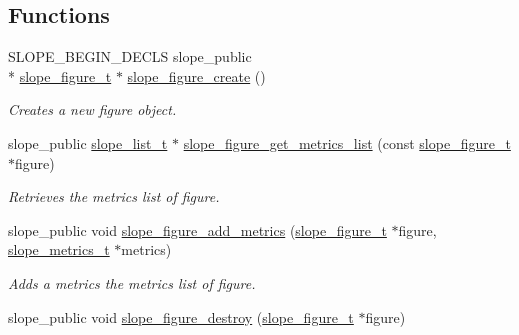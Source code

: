 \subsection*{Functions}
\begin{DoxyCompactItemize}
\item 
S\+L\+O\+P\+E\+\_\+\+B\+E\+G\+I\+N\+\_\+\+D\+E\+C\+L\+S slope\+\_\+public \\*
\hyperlink{group__Figure_ga507cc82eeca8255d6c0f603ffdaeb59e}{slope\+\_\+figure\+\_\+t} $\ast$ \hyperlink{group__Figure_ga0534b5fef88fda65fd4b8feb33071cab}{slope\+\_\+figure\+\_\+create} ()
\begin{DoxyCompactList}\small\item\em Creates a new figure object. \end{DoxyCompactList}\item 
slope\+\_\+public \hyperlink{struct__slope__list}{slope\+\_\+list\+\_\+t} $\ast$ \hyperlink{group__Figure_gac7d6aaca4df6806f00f3cb130a78dcde}{slope\+\_\+figure\+\_\+get\+\_\+metrics\+\_\+list} (const \hyperlink{group__Figure_ga507cc82eeca8255d6c0f603ffdaeb59e}{slope\+\_\+figure\+\_\+t} $\ast$figure)
\begin{DoxyCompactList}\small\item\em Retrieves the metrics list of figure. \end{DoxyCompactList}\item 
\hypertarget{group__Figure_ga08b6896169ef4a926e7d487ade3fe74e}{slope\+\_\+public void \hyperlink{group__Figure_ga08b6896169ef4a926e7d487ade3fe74e}{slope\+\_\+figure\+\_\+add\+\_\+metrics} (\hyperlink{group__Figure_ga507cc82eeca8255d6c0f603ffdaeb59e}{slope\+\_\+figure\+\_\+t} $\ast$figure, \hyperlink{group__Metrics_gab80787ee8ae8dc449e770249fe0e3c35}{slope\+\_\+metrics\+\_\+t} $\ast$metrics)}\label{group__Figure_ga08b6896169ef4a926e7d487ade3fe74e}

\begin{DoxyCompactList}\small\item\em Adds a metrics the metrics list of figure. \end{DoxyCompactList}\item 
\hypertarget{group__Figure_gada369b301fabc0c40ef172e22d4fcb85}{slope\+\_\+public void \hyperlink{group__Figure_gada369b301fabc0c40ef172e22d4fcb85}{slope\+\_\+figure\+\_\+destroy} (\hyperlink{group__Figure_ga507cc82eeca8255d6c0f603ffdaeb59e}{slope\+\_\+figure\+\_\+t} $\ast$figure)}\label{group__Figure_gada369b301fabc0c40ef172e22d4fcb85}


\end{DoxyCompactItemize}
